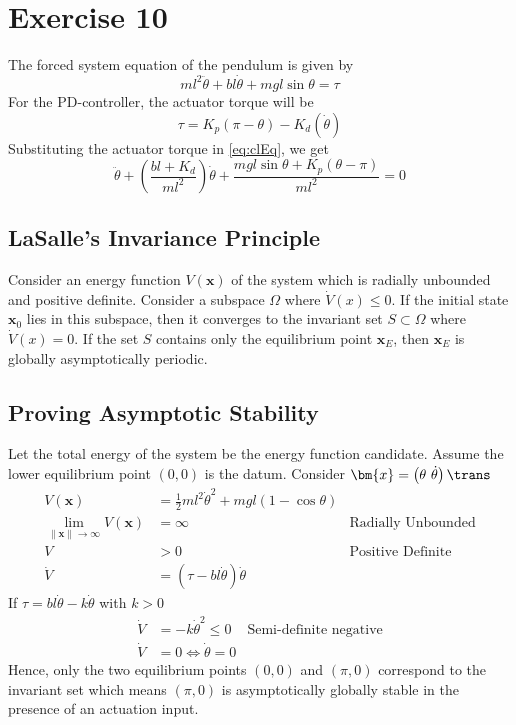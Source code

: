 \section{Exercise 10}
The forced system equation of the pendulum is given by
\begin{equation}
	ml^2\ddot{\theta} + bl\dot{\theta} + mgl\sin\theta = \tau
	\label{eq:clEq}
\end{equation}
For the PD-controller, the actuator torque will be 
\begin{equation*}
	\tau = K_p\left(\pi - \theta\right) - K_d\left(\dot{\theta}\right)
\end{equation*}
Substituting the actuator torque in \eqref{eq:clEq}, we get
\begin{equation*}
	\ddot{\theta} + \left(\frac{bl + K_d}{ml^2}\right)\dot{\theta} + \frac{mgl\sin\theta + K_p\left(\theta - \pi\right)}{ml^2} = 0
\end{equation*}

\subsection{LaSalle's Invariance Principle}
Consider an energy function $V\left(\bm{x}\right)$ of the system which is radially unbounded and positive definite. Consider a subspace $\Omega$ where $\dot{V}\left(x\right) \leq 0$. If the initial state $\bm{x}_0$ lies in this subspace, then it converges to the invariant set $S \subset \Omega$ where $\dot{V}\left(x\right) = 0$. If the set $S$ contains only the equilibrium point $\bm{x}_E$, then $\bm{x}_E$ is globally asymptotically periodic.
\subsection{Proving Asymptotic Stability}
Let the total energy of the system be the energy function candidate. Assume the lower equilibrium point $\left(0,0\right)$ is the datum. Consider $\bm{x} = \left(\theta \text{ } \dot{\theta}\right)\trans$
\begin{align*}
	V\left(\bm{x}\right) &= \frac{1}{2}ml^2\dot{\theta}^2 + mgl\left(1 - \cos\theta\right)\\
	\lim_{\|\bm{x}\|\to\infty} V\left(\bm{x}\right) &= \infty & \text{Radially Unbounded}\\
	V &> 0 & \text{Positive Definite}\\
	\dot{V} &= \left(\tau - bl\dot{\theta}\right)\dot{\theta}
\end{align*}
If $\tau = bl\dot{\theta} - k\dot{\theta}$ with $k > 0$
\begin{align*}
	\dot{V} &= -k\dot{\theta}^2 \leq 0 &\text{Semi-definite negative}\\
	\dot{V} &= 0 \Leftrightarrow \dot{\theta} = 0
\end{align*}
Hence, only the two equilibrium points $\left(0,0\right)$ and $\left(\pi,0\right)$ correspond to the invariant set which means $\left(\pi,0\right)$ is asymptotically globally stable in the presence of an actuation input.

